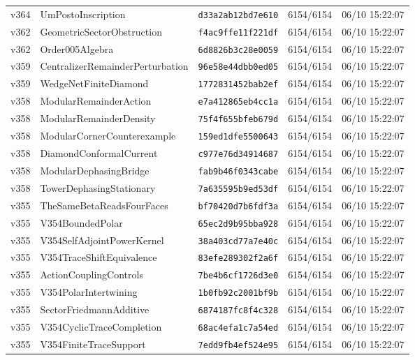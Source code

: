 \documentclass[11pt]{article}
\theoremstyle{definition}\newtheorem{deriv}{Derivation}
\begin{document}
{\begin{longtable}{@{}lllll@{}}
v364 & UmPostoInscription & \texttt{d33a2ab12bd7e610} & 6154/6154 & 06/10 15:22:07 \\
v362 & GeometricSectorObstruction & \texttt{f4ac9ffe11f221df} & 6154/6154 & 06/10 15:22:07 \\
v362 & Order005Algebra & \texttt{6d8826b3c28e0059} & 6154/6154 & 06/10 15:22:07 \\
v359 & CentralizerRemainderPerturbation & \texttt{96e58e44dbb0ed05} & 6154/6154 & 06/10 15:22:07 \\
v359 & WedgeNetFiniteDiamond & \texttt{1772831452bab2ef} & 6154/6154 & 06/10 15:22:07 \\
v358 & ModularRemainderAction & \texttt{e7a412865eb4cc1a} & 6154/6154 & 06/10 15:22:07 \\
v358 & ModularRemainderDensity & \texttt{75f4f655bfeb679d} & 6154/6154 & 06/10 15:22:07 \\
v358 & ModularCornerCounterexample & \texttt{159ed1dfe5500643} & 6154/6154 & 06/10 15:22:07 \\
v358 & DiamondConformalCurrent & \texttt{c977e76d34914687} & 6154/6154 & 06/10 15:22:07 \\
v358 & ModularDephasingBridge & \texttt{fab9b46f0343cabe} & 6154/6154 & 06/10 15:22:07 \\
v358 & TowerDephasingStationary & \texttt{7a635595b9ed53df} & 6154/6154 & 06/10 15:22:07 \\
v355 & TheSameBetaReadsFourFaces & \texttt{bf70420d7b6fdf3a} & 6154/6154 & 06/10 15:22:07 \\
v355 & V354BoundedPolar & \texttt{65ec2d9b95bba928} & 6154/6154 & 06/10 15:22:07 \\
v355 & V354SelfAdjointPowerKernel & \texttt{38a403cd77a7e40c} & 6154/6154 & 06/10 15:22:07 \\
v355 & V354TraceShiftEquivalence & \texttt{83efe289302f2a6f} & 6154/6154 & 06/10 15:22:07 \\
v355 & ActionCouplingControls & \texttt{7be4b6cf1726d3e0} & 6154/6154 & 06/10 15:22:07 \\
v355 & V354PolarIntertwining & \texttt{1b0fb92c2001bf9b} & 6154/6154 & 06/10 15:22:07 \\
v355 & SectorFriedmannAdditive & \texttt{6874187fc8f4c328} & 6154/6154 & 06/10 15:22:07 \\
v355 & V354CyclicTraceCompletion & \texttt{68ac4efa1c7a54ed} & 6154/6154 & 06/10 15:22:07 \\
v355 & V354FiniteTraceSupport & \texttt{7edd9fb4ef524e95} & 6154/6154 & 06/10 15:22:07 \\

\end{longtable}}
\end{document}
